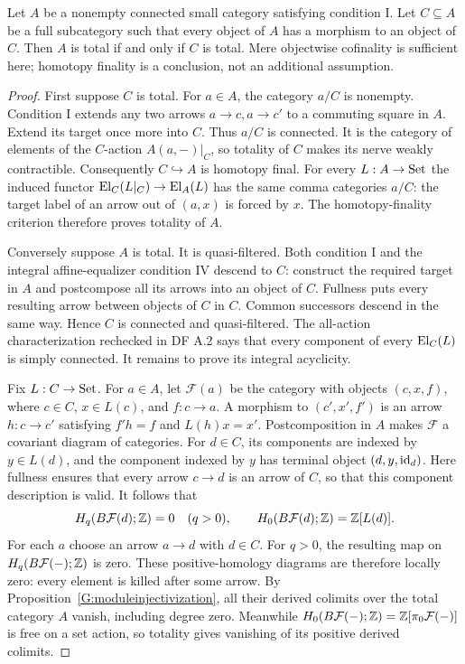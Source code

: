 \begin{theorem}
\label{A:cofinal-totality}
Let $A$ be a nonempty connected small category satisfying condition I.
Let $C\subseteq A$ be a full subcategory such that every object of $A$
has a morphism to an object of $C$. Then $A$ is total if and only if
$C$ is total. Mere objectwise cofinality is sufficient here; homotopy
finality is a conclusion, not an additional assumption.
\end{theorem}
\begin{proof}
First suppose $C$ is total. For $a\in A$, the category $a/C$ is
nonempty. Condition I extends any two arrows $a\to c,a\to c'$ to
a commuting square in $A$. Extend its target once more into $C$.
Thus $a/C$ is connected. It is the category of elements of the
$C$-action $A(a,-)|_C$, so totality of $C$ makes its nerve weakly
contractible. Consequently $C\hookrightarrow A$ is homotopy final.
For every $L:A\to\mathrm{Set}$ the induced functor
$\operatorname{El}_C(L|_C)\to\operatorname{El}_A(L)$ has the same comma categories $a/C$:
the target label of an arrow out of $(a,x)$ is forced by $x$.
The homotopy-finality criterion therefore proves totality of $A$.

Conversely suppose $A$ is total. It is quasi-filtered. Both
condition I and the integral affine-equalizer condition IV descend
to $C$: construct the required target in $A$ and postcompose all
its arrows into an object of $C$. Fullness puts every resulting
arrow between objects of $C$ in $C$. Common successors descend in
the same way. Hence $C$ is connected and quasi-filtered. The
all-action characterization rechecked in DF A.2 says that every
component of every $\operatorname{El}_C(L)$ is simply connected. It remains to
prove its integral acyclicity.

Fix $L:C\to\mathrm{Set}$. For $a\in A$, let $\mathcal F(a)$ be the
category with objects $(c,x,f)$, where $c\in C$, $x\in L(c)$,
and $f:c\to a$. A morphism to $(c',x',f')$ is an arrow
$h:c\to c'$ satisfying $f'h=f$ and $L(h)x=x'$.
Postcomposition in $A$ makes $\mathcal F$ a covariant diagram
of categories. For $d\in C$, its components are indexed by
$y\in L(d)$, and the component indexed by $y$ has terminal object
$(d,y,\mathrm{id}_d)$. Here fullness ensures that every arrow $c\to d$
is an arrow of $C$, so that this component description is valid.
It follows that
\[
 H_q(B\mathcal F(d);\mathbb Z)=0\quad(q>0),\qquad
 H_0(B\mathcal F(d);\mathbb Z)=\mathbb Z[L(d)].
\]
For each $a$ choose an arrow $a\to d$ with $d\in C$.
For $q>0$, the resulting map on $H_q(B\mathcal F(-);\mathbb Z)$ is
zero. These positive-homology diagrams are therefore locally
zero: every element is killed after some arrow. By
Proposition~\ref{G:moduleinjectivization}, all their derived
colimits over the total category $A$ vanish, including degree
zero. Meanwhile
$H_0(B\mathcal F(-);\mathbb Z)=\mathbb Z[\pi_0\mathcal F(-)]$
is free on a set action, so totality gives vanishing of its
positive derived colimits.


\end{proof}

